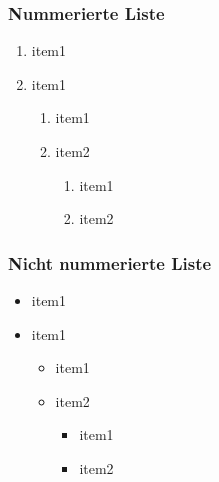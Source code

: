 \subsubsection{Nummerierte Liste}
\begin{enumerate}
	\item item1
	\item item1
	\begin{enumerate}
		\item item1
		\item item2
		\begin{enumerate}
			\item item1
			\item item2
		\end{enumerate}
	\end{enumerate}
\end{enumerate}


\subsubsection{Nicht nummerierte Liste}
\begin{itemize}
	\item item1
	\item item1
	\begin{itemize}
		\item item1
		\item item2
		\begin{itemize}
			\item item1
			\item item2
		\end{itemize}
	\end{itemize}
\end{itemize}
